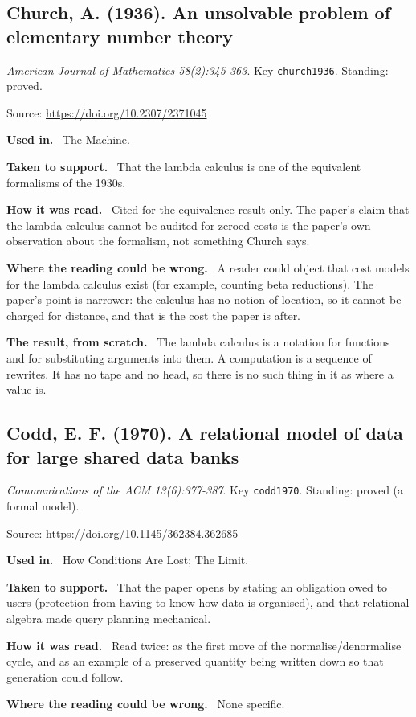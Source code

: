 \documentclass[11pt,oneside]{article}
\newcommand{\field}[1]{\par\noindent\textbf{\color{accent}#1.}\ }
\begin{document}
\hypertarget{src:church1936}{}
\subsection*{Church, A. (1936). An unsolvable problem of elementary number theory}
\noindent\small\emph{American Journal of Mathematics 58(2):345-363}. Key \texttt{church1936}. Standing: proved.
\par\noindent\small Source: \url{https://doi.org/10.2307/2371045}
\normalsize
\field{Used in} The Machine.
\field{Taken to support} That the lambda calculus is one of the equivalent formalisms of the 1930s.
\field{How it was read} Cited for the equivalence result only. The paper's claim that the lambda calculus cannot be audited for zeroed costs is the paper's own observation about the formalism, not something Church says.
\field{Where the reading could be wrong} A reader could object that cost models for the lambda calculus exist (for example, counting beta reductions). The paper's point is narrower: the calculus has no notion of location, so it cannot be charged for distance, and that is the cost the paper is after.
\field{The result, from scratch} The lambda calculus is a notation for functions and for substituting arguments into them. A computation is a sequence of rewrites. It has no tape and no head, so there is no such thing in it as where a value is.

\hypertarget{src:codd1970}{}
\subsection*{Codd, E. F. (1970). A relational model of data for large shared data banks}
\noindent\small\emph{Communications of the ACM 13(6):377-387}. Key \texttt{codd1970}. Standing: proved (a formal model).
\par\noindent\small Source: \url{https://doi.org/10.1145/362384.362685}
\normalsize
\field{Used in} How Conditions Are Lost; The Limit.
\field{Taken to support} That the paper opens by stating an obligation owed to users (protection from having to know how data is organised), and that relational algebra made query planning mechanical.
\field{How it was read} Read twice: as the first move of the normalise/denormalise cycle, and as an example of a preserved quantity being written down so that generation could follow.
\field{Where the reading could be wrong} None specific.

\hypertarget{src:conway1968}{}
\end{document}
